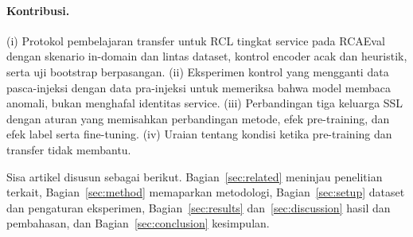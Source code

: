 \paragraph{Kontribusi.} (i) Protokol pembelajaran transfer untuk RCL tingkat service pada RCAEval dengan skenario in-domain dan lintas dataset, kontrol encoder acak dan heuristik, serta uji bootstrap berpasangan. (ii) Eksperimen kontrol yang mengganti data pasca-injeksi dengan data pra-injeksi untuk memeriksa bahwa model membaca anomali, bukan menghafal identitas service. (iii) Perbandingan tiga keluarga SSL dengan aturan yang memisahkan perbandingan metode, efek pre-training, dan efek label serta fine-tuning. (iv) Uraian tentang kondisi ketika pre-training dan transfer tidak membantu. 

Sisa artikel disusun sebagai berikut. Bagian~\ref{sec:related} meninjau penelitian terkait, Bagian~\ref{sec:method} memaparkan metodologi, Bagian~\ref{sec:setup} dataset dan pengaturan eksperimen, Bagian~\ref{sec:results} dan~\ref{sec:discussion} hasil dan pembahasan, dan Bagian~\ref{sec:conclusion} kesimpulan.
